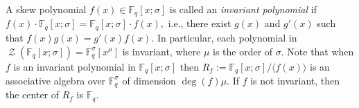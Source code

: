 \documentclass[12pt,paper]{article}
\theoremstyle{plain}
\newcommand{\Fq}{\mathbb{F}_{q}}
\DeclareMathOperator{\Z}{\mathcal{Z}}
\begin{document}
A skew polynomial $f(x) \in \Fq[x;\sigma]$ is called an \emph{invariant polynomial} if $f(x)\cdot \Fq[x;\sigma] = \Fq[x;\sigma]\cdot f(x),$ i.e., there exist $g(x)$ and $ g'(x) $ such that $ f(x)g(x)= g'(x)f(x).$ In particular,   each polynomial in  $ \Z(\Fq[x;\sigma])=\Fq^{\sigma}[x^{\mu}]$ is   invariant, where $\mu$ is the order of $\sigma$. Note that when $f$ is an invariant polynomial in $\Fq[x;\sigma]$  then $R_f:=\Fq[x;\sigma]/\langle f(x)\rangle$ is an associative algebra over  $ \Fq^{\sigma} $ of dimension $ \deg(f) \mu.$   If $f$ is not invariant, then the center of $ R_f$ is $ \Fq.$

\end{document}
